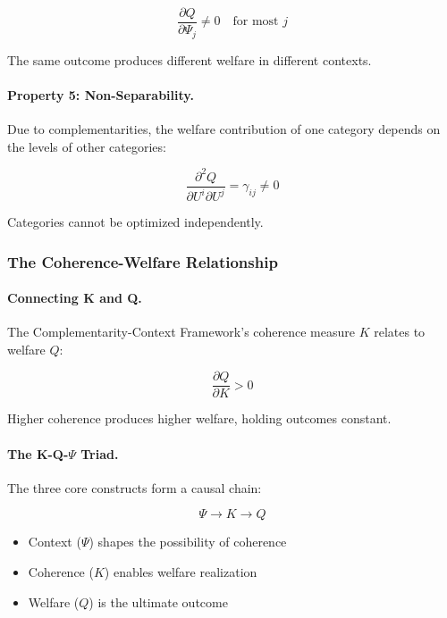 \begin{equation}
\frac{\partial Q}{\partial \Psi_j} \neq 0 \quad \text{for most } j
\end{equation}

The same outcome produces different welfare in different contexts.

\paragraph{Property 5: Non-Separability.}
Due to complementarities, the welfare contribution of one category 
depends on the levels of other categories:

\begin{equation}
\frac{\partial^2 Q}{\partial U^i \partial U^j} = \gamma_{ij} \neq 0
\end{equation}

Categories cannot be optimized independently.

\subsubsection{The Coherence-Welfare Relationship}

\paragraph{Connecting K and Q.}
The Complementarity-Context Framework's coherence measure $K$ relates to 
welfare $Q$:

\begin{equation}
\frac{\partial Q}{\partial K} > 0
\end{equation}

Higher coherence produces higher welfare, holding outcomes constant.

\paragraph{The K-Q-$\Psi$ Triad.}
The three core constructs form a causal chain:

\begin{equation}
\Psi \longrightarrow K \longrightarrow Q
\end{equation}

\begin{itemize}
\item Context ($\Psi$) shapes the possibility of coherence
\item Coherence ($K$) enables welfare realization
\item Welfare ($Q$) is the ultimate outcome
\end{itemize}

